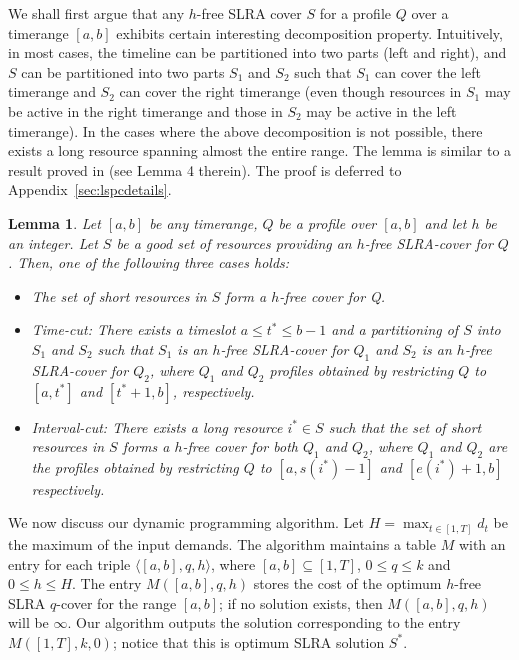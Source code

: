 \documentclass[11pt]{article}
\newtheorem{lemma}[theorem]{Lemma}
\begin{document}
We shall first argue that any $h$-free SLRA cover $S$ for a profile $Q$ over a timerange $[a,b]$ exhibits 
certain interesting decomposition property.
Intuitively, in most cases, the timeline can be partitioned into two parts (left and right),
and $S$ can be partitioned into two parts $S_1$ and $S_2$ such that 
$S_1$ can cover the left timerange and $S_2$ can cover the right timerange
(even though resources in $S_1$ may be active in the right timerange and those in $S_2$
may be active in the left timerange).
In the cases where the above decomposition is not possible,
there exists a long resource spanning almost the entire range.
The lemma is similar to a result proved in \cite{esa2011} (see Lemma 4 therein).
The proof is deferred to Appendix~\ref{sec:lspcdetails}.

\begin{lemma}
\label{lem:decomp}
Let $[a,b]$ be any timerange, $Q$ be a profile over $[a,b]$ and let $h$ be an integer.
Let $S$ be a good set of resources providing an $h$-free SLRA-cover for $Q$.
Then, one of the following three cases holds:
\begin{itemize}
\item
The set of short resources in $S$ form a $h$-free cover for Q.
\item 
{\it Time-cut: } There exists a timeslot $a\leq t^*\leq b-1$ and a partitioning of $S$ into $S_1$ and $S_2$
such that $S_1$ is an $h$-free SLRA-cover for $Q_1$ and $S_2$ is an $h$-free SLRA-cover for $Q_2$,
where $Q_1$ and $Q_2$ profiles obtained by restricting $Q$ to $[a,t^*]$ and $[t^*+1,b]$, respectively.
\item
{\it Interval-cut:}
There exists a long resource $i^*\in S$
such that the set of short resources in $S$ forms a $h$-free cover for both $Q_1$ and $Q_2$, where
$Q_1$ and $Q_2$  are the profiles obtained by restricting $Q$ to $[a,s(i^*)-1]$ and  $[e(i^*)+1,b]$ 
respectively.
\end{itemize}
\end{lemma}

We now discuss our dynamic programming algorithm.
Let $H=\max_{t\in[1,T]} d_t$ be the maximum of  the input demands. 
The algorithm maintains a table $M$ with an entry for each triple $\langle [a,b], q, h\rangle$,
where $[a,b]\subseteq [1,T]$, $0\leq q\leq k$ and $0\leq h\leq H$.
The entry $M([a,b],q,h)$ stores the cost of the optimum $h$-free SLRA $q$-cover for the range $[a,b]$;
if no solution exists, then $M([a,b],q,h)$ will be $\infty$.
Our algorithm outputs the solution corresponding to the entry  $M([1,T],k,0)$; notice that 
this is optimum SLRA solution $S^*$.
\end{document}
